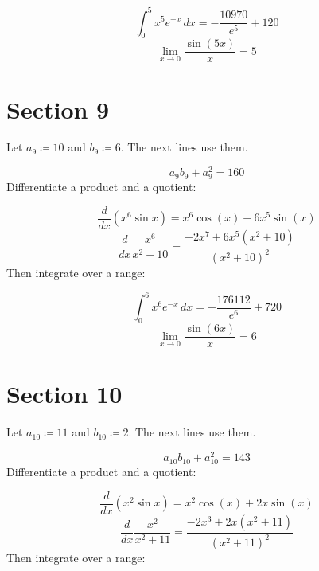 \documentclass[11pt,a4paper]{article}
\theoremstyle{plain}
\theoremstyle{definition}
\theoremstyle{remark}
\begin{document}
\begin{equation*}
  \int_0^{5} x^{5} e^{-x} \, dx = -\frac{10970}{e^{5}} + 120
\end{equation*}
\begin{equation*}
  \lim_{x \to 0} \frac{\sin(5 x)}{x} = 5
\end{equation*}
\section*{Section 9}

Let $a_{9} \coloneqq  10$ and $b_{9} \coloneqq  6$. The next lines use them.

\begin{equation*}
  a_{9} b_{9} + a_{9}^2 = 160
\end{equation*}
Differentiate a product and a quotient:

\begin{equation*}
  \frac{d}{dx} \left( x^{6} \sin x \right) = x^{6} \cos\left(x\right) + 6 x^{5} \sin\left(x\right)
\end{equation*}
\begin{equation*}
  \frac{d}{dx} \frac{x^{6}}{x^2 + 10} = \frac{-2 x^{7} + 6 x^{5} \left(x^{2} + 10\right)}{\left(x^{2} + 10\right)^{2}}
\end{equation*}
Then integrate over a range:

\begin{equation*}
  \int_0^{6} x^{6} e^{-x} \, dx = -\frac{176112}{e^{6}} + 720
\end{equation*}
\begin{equation*}
  \lim_{x \to 0} \frac{\sin(6 x)}{x} = 6
\end{equation*}
\section*{Section 10}

Let $a_{10} \coloneqq  11$ and $b_{10} \coloneqq  2$. The next lines use them.

\begin{equation*}
  a_{10} b_{10} + a_{10}^2 = 143
\end{equation*}
Differentiate a product and a quotient:

\begin{equation*}
  \frac{d}{dx} \left( x^{2} \sin x \right) = x^{2} \cos\left(x\right) + 2 x \sin\left(x\right)
\end{equation*}
\begin{equation*}
  \frac{d}{dx} \frac{x^{2}}{x^2 + 11} = \frac{-2 x^{3} + 2 x \left(x^{2} + 11\right)}{\left(x^{2} + 11\right)^{2}}
\end{equation*}
Then integrate over a range:
\end{document}
